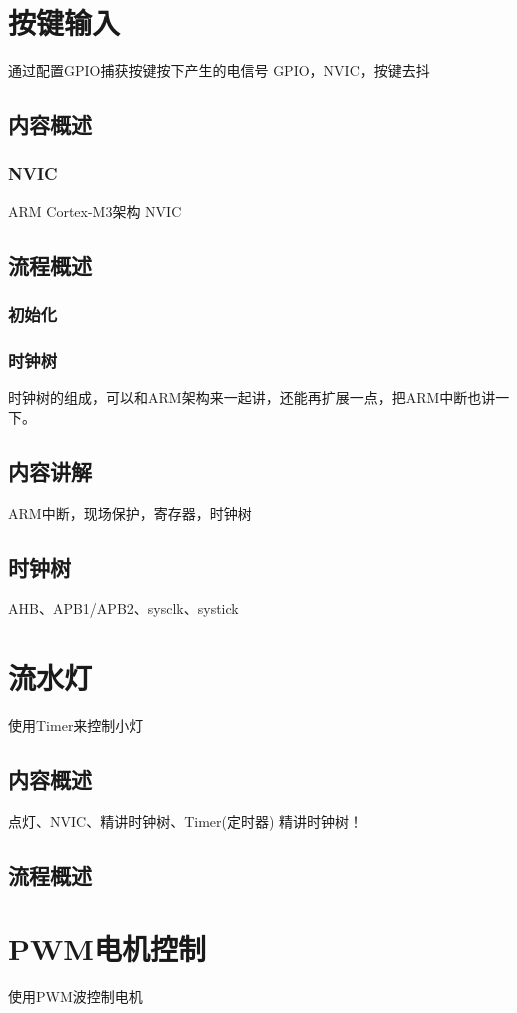 \documentclass[UTF8]{ctexart}
\begin{document}
\section{按键输入}
通过配置GPIO捕获按键按下产生的电信号
GPIO，NVIC，按键去抖
\subsection{内容概述}
\subsubsection{NVIC}
ARM Cortex-M3架构 NVIC
\subsection{流程概述}
\subsubsection{初始化}



\subsubsection{时钟树}
时钟树的组成，可以和ARM架构来一起讲，还能再扩展一点，把ARM中断也讲一下。
\subsection{内容讲解}
ARM中断，现场保护，寄存器，时钟树
\subsection{时钟树}
AHB、APB1/APB2、sysclk、systick




\section{流水灯}
使用Timer来控制小灯
\subsection{内容概述}
点灯、NVIC、精讲时钟树、Timer(定时器)
精讲时钟树！
\subsection{流程概述}


\section{PWM电机控制}
使用PWM波控制电机
\end{document}
